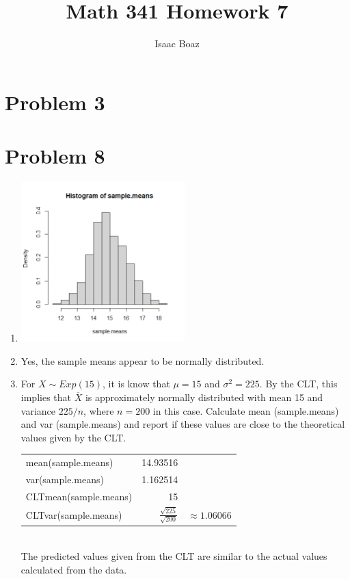 \documentclass{article}
\title{\vspace{-4ex}Math 341 Homework 7}
\author{Isaac Boaz}
\begin{document}
\maketitle

\section*{Problem 3}
\pagebreak
\section*{Problem 8}

\begin{enumerate}[label=\alph*)]
    \item \includegraphics[width=0.5\textwidth]{histogram.png}
    \item Yes, the sample means appear to be normally distributed.
    \item For \(X \sim Exp(15)\), it is know that \(\mu = 15\) and \(\sigma^2 = 225\). By the CLT, this implies that \(\overline{X}\) is approximately normally distributed with mean 15 and variance \(225/n\), where \(n = 200\) in this case. Calculate mean (sample.means) and var (sample.means) and report if these values are close to the theoretical values given by the CLT. \\
          \begin{tabular}{l|rl}
              mean(sample.means) & 14.93516 \\
              var(sample.means)  & 1.162514 \\
              CLTmean(sample.means) & 15 \\
              CLTvar(sample.means) & \(\frac{\sqrt{225}}{\sqrt{200}}\) & \(\approx 1.06066\)  \\
          \end{tabular} \\[1.0em]
          The predicted values given from the CLT are similar to the actual values calculated from the data.
\end{enumerate}
\end{document}

